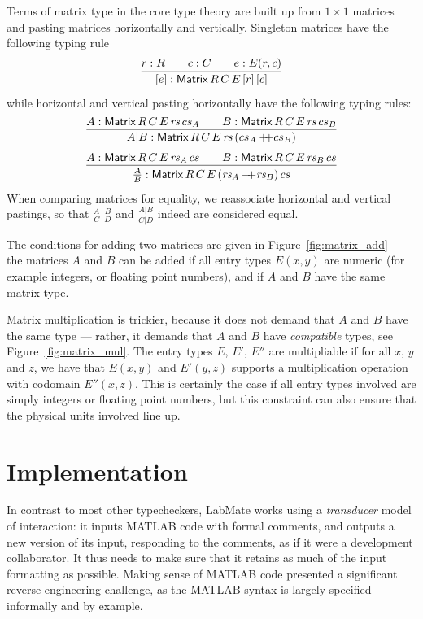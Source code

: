 \documentclass{IMEKO2024}
\newcommand{\isadd}[1]{#1\ \textsf{numeric}}
\newcommand{\ismult}[3]{(#1, #2, #3)\ \textsf{multipliable}}
\newcommand{\append}{+\!\!\!+}
\newcommand{\hjux}[2]{{#1}|{#2}}
\newcommand{\vjux}[2]{\frac{#1}{#2}}
\newcommand{\Matrix}[5]{\mathsf{Matrix}\,#1\,#2\,#3\,#4\,#5}
\newcommand{\remph}{\emph}
\begin{document}
Terms of matrix type in the core type theory are built up from
$1 \times 1$ matrices and pasting matrices horizontally and vertically.
%
Singleton matrices have the following typing rule
\[
  \infer{[e] : \Matrix{R}{C}{E}{[r]}{[c]}}
    {r : R
      &\quad
      c : C
      &\quad
      e : E(r, c)
    }
\]
%
while horizontal and vertical pasting horizontally have the following
typing rules:
\[
  \infer{\hjux{A}{B} : \Matrix{R}{C}{E}{\rs}{(cs_A \append cs_B)}}
  {
    A : \Matrix{R}{C}{E}{\rs}{cs_A}
    &\quad
    B : \Matrix{R}{C}{E}{\rs}{cs_B}
  }
\]
\[
  \infer{\vjux{A}{B} : \Matrix{R}{C}{E}{(\rs_A \append \rs_B)}{cs}}
  {
    A : \Matrix{R}{C}{E}{\rs_A}{cs}
    &\quad
    B : \Matrix{R}{C}{E}{\rs_B}{cs}
  }
\]
When comparing matrices for equality, we reassociate horizontal and
vertical pastings, so that $\hjux{\vjux{A}{C}}{\vjux{B}{D}}$ and
$\vjux{\hjux{A}{B}}{\hjux{C}{D}}$ indeed are considered equal.

The conditions for adding two matrices are given in Figure~\ref{fig:matrix_add} --- the matrices $A$ and $B$ can be added if all entry types $E(x, y)$ are
numeric (for example integers, or floating point numbers), and if $A$
and $B$ have the same matrix type.
%
%

Matrix multiplication is trickier, because it does not demand that $A$
and $B$ have the same type --- rather, it demands that $A$ and $B$
have \remph{compatible} types, see Figure~\ref{fig:matrix_mul}.
%
The entry types $E$, $E'$, $E''$ are multipliable if for all $x$, $y$
and $z$, we have that $E(x, y)$ and $E'(y, z)$ supports a
multiplication operation with codomain $E''(x, z)$.
%
This is certainly the case if all entry types involved are simply
integers or floating point numbers, but this constraint can also
ensure that the physical units involved line up.



\section{Implementation}

In contrast to most other typecheckers, LabMate works using a
\remph{transducer} model of interaction: it inputs MATLAB code with
formal comments, and outputs a new version of its input, responding to
the comments, as if it were a development collaborator.  It thus needs
to make sure that it retains as much of the input formatting as
possible.  Making sense of MATLAB code presented a significant reverse
engineering challenge, as the MATLAB syntax is largely specified
informally and by example.
\end{document}
